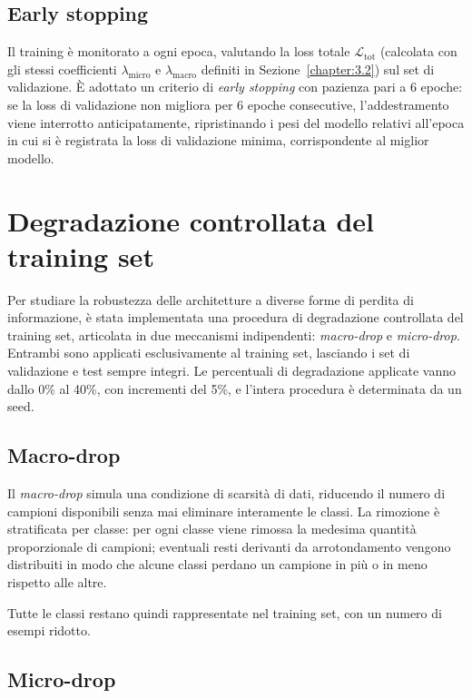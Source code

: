 \subsection{Early stopping}

Il training è monitorato a ogni epoca, valutando la loss totale $\mathcal{L}_{\text{tot}}$ (calcolata con gli stessi coefficienti $\lambda_{\text{micro}}$ e $\lambda_{\text{macro}}$ definiti in Sezione~\ref{chapter:3.2}) sul set di validazione. 
È adottato un criterio di \emph{early stopping} con pazienza pari a 6 epoche: se la loss di validazione non migliora per 6 epoche 
consecutive, l'addestramento viene interrotto anticipatamente, ripristinando i pesi del modello relativi all'epoca in cui si è 
registrata la loss di validazione minima, corrispondente al miglior modello.

\section{Degradazione controllata del training set}
\label{sec:degradazione}

Per studiare la robustezza delle architetture a diverse forme di perdita di informazione, 
è stata implementata una procedura di degradazione controllata del training set, articolata in due meccanismi indipendenti: \emph{macro-drop} e \emph{micro-drop}. 
Entrambi sono applicati esclusivamente al training set, lasciando i set di validazione e test sempre integri. 
Le percentuali di degradazione applicate vanno dallo 0\% al 40\%, con incrementi del 5\%, e l'intera procedura è determinata da un seed.

\subsection*{Macro-drop}

Il \emph{macro-drop} simula una condizione di scarsità di dati, riducendo il numero di campioni disponibili senza mai eliminare interamente le classi. 
La rimozione è stratificata per classe: per ogni classe viene rimossa la medesima quantità proporzionale di campioni; eventuali resti derivanti da arrotondamento vengono distribuiti in modo che alcune classi perdano 
un campione in più o in meno rispetto alle altre. 

Tutte le classi restano quindi rappresentate nel training set, con un numero di esempi ridotto. 

\subsection*{Micro-drop}

